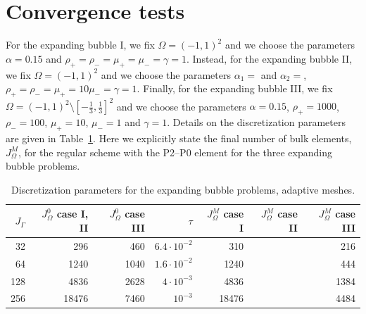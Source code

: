 \section{Convergence tests}\label{sec:ns_convergence_results}
For the expanding bubble I, we fix $\Omega = (-1,1)^2$ and we choose the
parameters $\alpha =0.15$ and $\rho_+ = \rho_- = \mu_+ = \mu_- = \gamma = 1$.
Instead, for the expanding bubble II, we fix $\Omega = (-1,1)^2$ and we choose
the parameters $\alpha_1 =$ and
$\alpha_2=$, $\rho_+ = \rho_- = \mu_+ = 10 \mu_- = \gamma = 1$. Finally, for
the expanding bubble III, we fix $\Omega = (-1,1)^2 \setminus
[-\frac13,\frac13]^2$ and we choose the parameters $\alpha=0.15$, $\rho_+ =
1000$, $\rho_- = 100$, $\mu_+ = 10$, $\mu_- = 1$ and $\gamma = 1$. Details on
the discretization parameters are given in
Table~\ref{tab:nsexpandingbubbleelements}. Here we explicitly state the final
number of bulk elements, $J_\Omega^M$, for the regular scheme with the P2--P0
element for the three expanding bubble problems.
\begin{table}
\center
\begin{tabular}{rrrrrrr}
\hline
$J_\Gamma$ & $J_\Omega^0$ case I, II & $J_\Omega^0$ case III & $\tau$ &
$J_\Omega^M$ case I & $J_\Omega^M$ case II & $J_\Omega^M$ case III \\
\hline
 32 &   296 &  460 & $6.4\cdot10^{-2}$ &   310 & &  216 \\
 64 &  1240 & 1040 & $1.6\cdot10^{-2}$ &  1240 & &  444 \\
128 &  4836 & 2628 &   $4\cdot10^{-3}$ &  4836 & & 1384 \\
256 & 18476 & 7460 &         $10^{-3}$ & 18476 & & 4484 \\
\hline
\end{tabular}
\caption[Navier--Stokes expanding bubble meshes parameters]
{Discretization parameters for the expanding bubble problems, adaptive meshes.}
\label{tab:nsexpandingbubbleelements}
\end{table}

